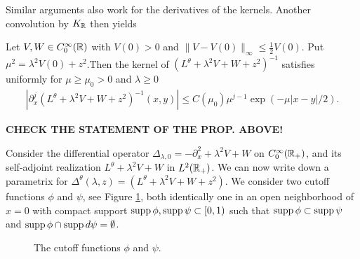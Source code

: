 Similar arguments also work for the derivatives of the kernels. Another convolution by $K_{\mathbb{R}}$
then yields 
\begin{prop}
Let $V,W\in C^\infty_0(\mathbb{R})$ with $V(0) > 0$ and $\| V-V(0) \|_\infty \leq \frac{1}{2}V(0)$.
Put $\mu^2=\lambda^2V(0) +z^2$.Then the kernel of $(L^\theta + \lambda^2V + W + z^2)^{-1}$
satisfies uniformly for $\mu\geq \mu_0>0$ and $\lambda \geq 0$
\begin{align}
|\partial_x^j (L^\theta + \lambda^2V + W + z^2)^{-1}(x,y)| \leq C(\mu_0) \mu^{j-1} \exp (-\mu|x-y|/2).
\end{align}
\end{prop}

\begin{center}
\textbf{CHECK THE STATEMENT OF THE PROP. ABOVE!}
\end{center}\medskip


Consider the differential operator $\Delta_{\lambda,0}=-\partial_x^2 + \lambda^2V+W$ on 
$C^\infty_0(\mathbb{R}_+)$, and its self-adjoint realization $L^\theta + \lambda^2V+W$ in $L^2(\mathbb{R}_+)$.
We can now write down a parametrix for 
$\Delta^\theta(\lambda,z)=(L^\theta + \lambda^2V+W + z^2)$. 
We consider two cutoff functions $\phi$ and $\psi$, see Figure \ref{fig:CutOff}, both 
identically one in an open neighborhood of $x=0$ with compact 
support $\textup{supp}\, \phi, \textup{supp}\, \psi \subset [0,1)$
such that $\textup{supp}\, \phi \subset \textup{supp}\, \psi$ and 
$\textup{supp}\, \phi \cap \textup{supp}\, d\psi = \emptyset$.

\begin{figure}[h]
\begin{center}


\caption{The cutoff functions $\phi$ and $\psi$.}
\label{fig:CutOff}
\end{center}
\end{figure}


